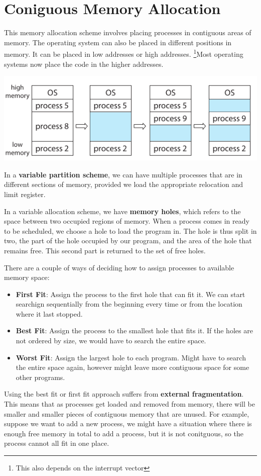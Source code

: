 \documentclass{tufte-handout}
\begin{document}
\section{Coniguous Memory Allocation}
This memory allocation scheme involves placing processes in contiguous areas of 
memory. The operating system can also be placed in different positions in 
memory. It can be placed in low addresses or high addresses.
\footnote{This also depends on the interrupt vector}Most operating systems now 
place the code in the higher addresses.

\begin{marginfigure}
	\includegraphics{partition}
	\caption{In a \textbf{variable partition scheme}, we can have multiple
			processes that are in different sections of memory, provided we 
			load the appropriate relocation and limit register.}
\end{marginfigure}

In a variable allocation scheme, we have \textbf{memory holes}, which refers to the 
space between two occupied regions of memory. When a process comes in ready to be 
scheduled, we choose a hole to load the program in. The hole is thus split in two,
the part of the hole occupied by our program, and the area of the hole that remains 
free. This second part is returned to the set of free holes.

There are a couple of ways of deciding how to assign processes to available memory 
space:
\begin{itemize}
	\item \textbf{First Fit}: Assign the process to the first hole that can fit 
				it. We can start searchign sequentially from the beginning every time
				or from the location where it last stopped.
	\item \textbf{Best Fit}: Assign the process to the smallest hole that fits it. 
				If the holes are not ordered by size, we would have to search the 
				entire space.
	\item \textbf{Worst Fit}: Assign the largest hole to each program. Might have to 
				search the entire space again, however might leave more contiguous
				space for some other programs.
\end{itemize}
Using the best fit or first fit approach suffers from \textbf{external fragmentation}.
This means that as processes get loaded and removed from memory, there will be smaller
and smaller pieces of contiguous memory that are unused. For example, suppose we want
to add a new process, we might have a situation where there is enough free memory in
total to add a process, but it is not conitguous, so the process cannot all fit in 
one place.
\end{document}
